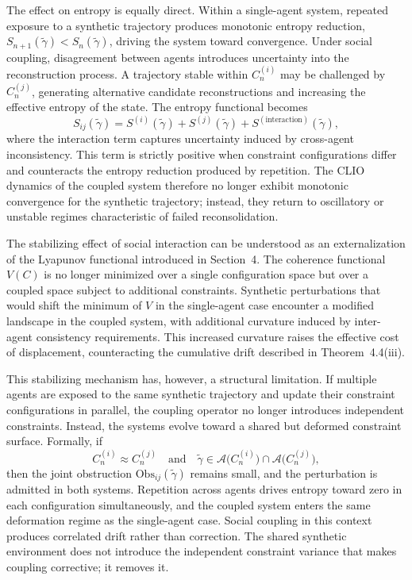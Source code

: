 \documentclass[12pt, a4paper]{article}
\begin{document}
The effect on entropy is equally direct. Within a single-agent system, repeated exposure to a synthetic trajectory produces monotonic entropy reduction, $S_{n+1}(\tilde{\gamma}) < S_n(\tilde{\gamma})$, driving the system toward convergence. Under social coupling, disagreement between agents introduces uncertainty into the reconstruction process. A trajectory stable within $C_n^{(i)}$ may be challenged by $C_n^{(j)}$, generating alternative candidate reconstructions and increasing the effective entropy of the state. The entropy functional becomes
\[
S_{ij}(\tilde{\gamma}) = S^{(i)}(\tilde{\gamma}) + S^{(j)}(\tilde{\gamma}) + S^{(\mathrm{interaction})}(\tilde{\gamma}),
\]
where the interaction term captures uncertainty induced by cross-agent inconsistency. This term is strictly positive when constraint configurations differ and counteracts the entropy reduction produced by repetition. The CLIO dynamics of the coupled system therefore no longer exhibit monotonic convergence for the synthetic trajectory; instead, they return to oscillatory or unstable regimes characteristic of failed reconsolidation.

The stabilizing effect of social interaction can be understood as an externalization of the Lyapunov functional introduced in Section~4. The coherence functional $V(C)$ is no longer minimized over a single configuration space but over a coupled space subject to additional constraints. Synthetic perturbations that would shift the minimum of $V$ in the single-agent case encounter a modified landscape in the coupled system, with additional curvature induced by inter-agent consistency requirements. This increased curvature raises the effective cost of displacement, counteracting the cumulative drift described in Theorem~4.4(iii).

This stabilizing mechanism has, however, a structural limitation. If multiple agents are exposed to the same synthetic trajectory and update their constraint configurations in parallel, the coupling operator no longer introduces independent constraints. Instead, the systems evolve toward a shared but deformed constraint surface. Formally, if
\[
C_n^{(i)} \approx C_n^{(j)} \quad \text{and} \quad \tilde{\gamma} \in \mathcal{A}\bigl(C_n^{(i)}\bigr) \cap \mathcal{A}\bigl(C_n^{(j)}\bigr),
\]
then the joint obstruction $\mathrm{Obs}_{ij}(\tilde{\gamma})$ remains small, and the perturbation is admitted in both systems. Repetition across agents drives entropy toward zero in each configuration simultaneously, and the coupled system enters the same deformation regime as the single-agent case. Social coupling in this context produces correlated drift rather than correction. The shared synthetic environment does not introduce the independent constraint variance that makes coupling corrective; it removes it.
\end{document}
